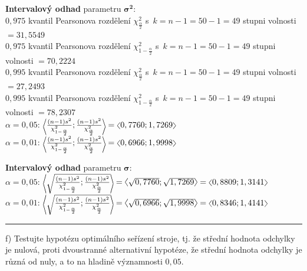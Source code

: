 \documentclass[a4paper, 11pt]{article}
\newcommand{\intlr}[1]{\scaleleftright[1ex]{<}{#1}{>}}
\begin{document}
	\vspace{1em}
	\textbf{Intervalový odhad} parametru $ \boldsymbol{\sigma^2} $: \\
	$ 0,975 $ kvantil Pearsonova rozdělení $ \chi_{\frac{\alpha}{2}}^2 $
	s~$ k = n - 1 = 50 - 1 = 49 $ stupni volnosti $ = 31,5549 $ \\
	$ 0,975 $ kvantil Pearsonova rozdělení $ \chi_{1 - \frac{\alpha}{2}}^2 $
	s~$ k = n - 1 = 50 - 1 = 49 $ stupni volnosti $ = 70,2224 $ \\
	$ 0,995 $ kvantil Pearsonova rozdělení $ \chi_{\frac{\alpha}{2}}^2 $
	s~$ k = n - 1 = 50 - 1 = 49 $ stupni volnosti $ = 27,2493 $ \\
	$ 0,995 $ kvantil Pearsonova rozdělení $ \chi_{1 - \frac{\alpha}{2}}^2 $
	s~$ k = n - 1 = 50 - 1 = 49 $ stupni volnosti $ = 78,2307 $ \\
	$ \alpha = 0,05 $: $ \intlr{\frac{(n - 1) s^2}{\chi_{1 -
	\frac{\alpha}{2}}^2}; \frac{(n - 1) s^2}{\chi_{\frac{\alpha}{2}}^2}} =
	\intlr{0,7760; 1,7269} $ \\
	$ \alpha = 0,01 $: $ \intlr{\frac{(n - 1) s^2}{\chi_{1 -
	\frac{\alpha}{2}}^2}; \frac{(n - 1) s^2}{\chi_{\frac{\alpha}{2}}^2}} =
	\intlr{0,6966; 1,9998} $

	\vspace{1em}
	\textbf{Intervalový odhad} parametru $ \boldsymbol{\sigma} $: \\
	$ \alpha = 0,05 $: $ \intlr{\sqrt{\frac{(n - 1) s^2}{\chi_{1 -
	\frac{\alpha}{2}}^2}; \frac{(n - 1) s^2}{\chi_{\frac{\alpha}{2}}^2}}} =
	\intlr{\sqrt{0,7760}; \sqrt{1,7269}} = \intlr{0,8809; 1,3141} $ \\
	$ \alpha = 0,01 $: $ \intlr{\sqrt{\frac{(n - 1) s^2}{\chi_{1 -
	\frac{\alpha}{2}}^2}; \frac{(n - 1) s^2}{\chi_{\frac{\alpha}{2}}^2}}} =
	\intlr{\sqrt{0,6966}; \sqrt{1,9998}} = \intlr{0,8346; 1,4141} $

	\vspace{1em}\noindent\rule{\textwidth}{.5pt}\vspace{1em}

	f) Testujte hypotézu optimálního seřízení stroje, tj. že střední
	hodnota odchylky je nulová, proti dvoustranné alternativní hypotéze,
	že střední hodnota odchylky je různá od nuly, a to na hladině
	významnosti $ 0,05 $.
	\vspace{1em}
\end{document}

